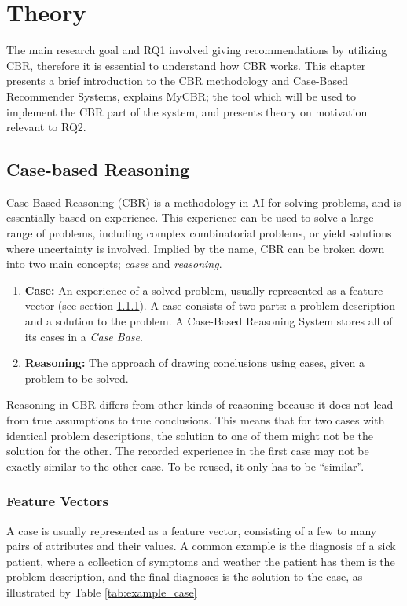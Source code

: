 \cleardoublepage

\chapter{Theory}
The main research goal and RQ1 involved giving recommendations by utilizing CBR, therefore it is essential to understand how CBR works. This chapter presents a brief introduction to the CBR methodology and Case-Based Recommender Systems, explains MyCBR; the tool which will be used to implement the CBR part of the system, and presents theory on motivation relevant to RQ2.


\section{Case-based Reasoning}
Case-Based Reasoning (CBR) is a methodology in AI for solving problems, and is essentially based on experience. This experience can be used to solve a large range of problems, including complex combinatorial problems, or yield solutions where uncertainty is involved\cite{richter2013case}. Implied by the name, CBR can be broken down into two main concepts; \textit{cases} and \textit{reasoning}.

\begin{enumerate}
    \item \textbf{Case:} An experience of a solved problem, usually represented as a feature vector (see section \ref{sec:feature_vectors}). A case consists of two parts: a problem description and a solution to the problem. A Case-Based Reasoning System stores all of its cases in a \textit{Case Base}.
    \item \textbf{Reasoning:} The approach of drawing conclusions using cases, given a problem to be solved.
\end{enumerate}

Reasoning in CBR differs from other kinds of reasoning because it does not lead from true assumptions to true conclusions. This means that for two cases with identical problem descriptions, the solution to one of them might not be the solution for the other. The recorded experience in the first case may not be exactly similar to the other case. To be reused, it only has to be \enquote{similar}.

\subsection{Feature Vectors}\label{sec:feature_vectors}
A case is usually represented as a feature vector, consisting of a few to many pairs of attributes and their values. A common example is the diagnosis of a sick patient, where a collection of symptoms and weather the patient has them is the problem description, and the final diagnoses is the solution to the case, as illustrated by Table \ref{tab:example_case}

